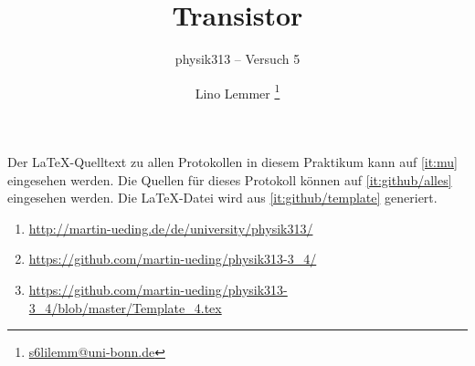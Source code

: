 


\usepackage{placeins}



\subject{Praktikumsprotokoll}
\title{Transistor}
\subtitle{physik313 – Versuch 5}
\author{
	Lino Lemmer \footnote{\href{mailto:s6lilemm@uni-bonn.de}{s6lilemm@uni-bonn.de}}
}


\newcommand\IB{I_\text{B}}
\newcommand\IC{I_\text{C}}
\newcommand\ID{I_\text{D}}
\newcommand\IE{I_\text{E}}
\newcommand\IS{I_\text{S}}
\newcommand\RC{R_\text{C}}
\newcommand\RD{R_\text{D}}
\newcommand\RE{R_\text{E}}
\newcommand\UBE{U_\text{BE}}
\newcommand\UB{U_\text{B}}
\newcommand\UC{U_\text{C}}
\newcommand\UCE{U_\text{CE}}
\newcommand\UE{U_\text{E}}
\newcommand\UG{U_\text{G}}
\newcommand\UGS{U_\text{GS}}
\newcommand\UDS{U_\text{DS}}
\newcommand\Uin{U_\text{in}}
\newcommand\Uout{U_\text{out}}



\maketitle

Der \LaTeX-Quelltext zu allen Protokollen in diesem Praktikum kann auf
\ref{it:mu} eingesehen werden. Die Quellen für dieses Protokoll können auf
\ref{it:github/alles} eingesehen werden. Die \LaTeX-Datei wird aus
\ref{it:github/template} generiert.

\begin{enumerate}
	\item
		\label{it:mu}
		\url{http://martin-ueding.de/de/university/physik313/}
	\item
		\label{it:github/alles}
		\url{https://github.com/martin-ueding/physik313-3_4/}
	\item
		\label{it:github/template}
		\url{https://github.com/martin-ueding/physik313-3_4/blob/master/Template_4.tex}
\end{enumerate}

\newpage
\tableofcontents
\newpage


